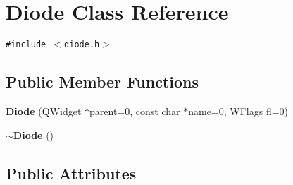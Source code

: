 \section{Diode Class Reference}
\label{classDiode}
{\tt \#include $<$diode.h$>$}

\subsection*{Public Member Functions}
\begin{CompactItemize}
\item 
{\bf Diode} (QWidget $\ast$parent=0, const char $\ast$name=0, WFlags fl=0)
\item 
{\bf $\sim$Diode} ()
\end{CompactItemize}
\subsection*{Public Attributes}
